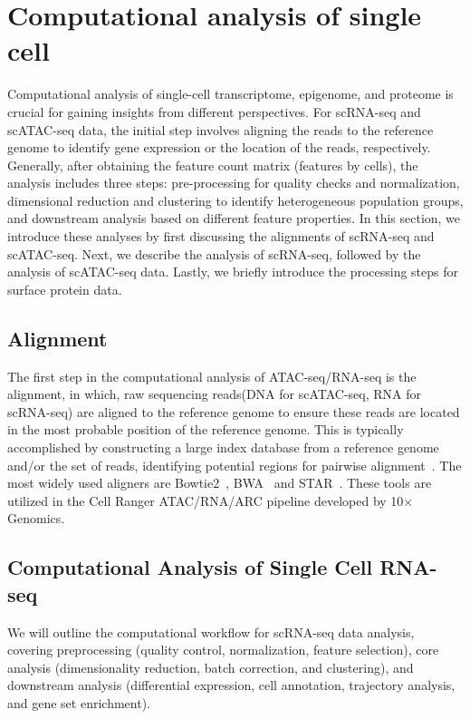 \section{Computational analysis of single cell}
\label{background:computational_singlecell}
Computational analysis of single-cell transcriptome, epigenome, and proteome is crucial for gaining insights from different perspectives. For scRNA-seq and scATAC-seq data, the initial step involves aligning the reads to the reference genome to identify gene expression or the location of the reads, respectively. Generally, after obtaining the feature count matrix (features by cells), the analysis includes three steps: pre-processing for quality checks and normalization, dimensional reduction and clustering to identify heterogeneous population groups, and downstream analysis based on different feature properties. In this section, we introduce these analyses by first discussing the alignments of scRNA-seq and scATAC-seq. Next, we describe the analysis of scRNA-seq, followed by the analysis of scATAC-seq data. Lastly, we briefly introduce the processing steps for surface protein data.

\subsection{Alignment}
\label{background:sec2:alignment}
The first step in the computational analysis of ATAC-seq/RNA-seq is the alignment,  in which, raw sequencing reads(DNA for scATAC-seq, RNA for scRNA-seq) are aligned to the reference genome to ensure these reads are located in the most probable position of the reference genome. This is typically accomplished by constructing a large index database from a reference genome and/or the set of reads, identifying potential regions for pairwise alignment~\citep{alser2021alignment}. The most widely used aligners are Bowtie2~\citep{langmead2012bowtie2}, BWA~\citep{li2009BWA} and STAR~\citep{dobin2013star}.  These tools are utilized in the Cell Ranger ATAC/RNA/ARC pipeline developed by 10$\times$ Genomics.

\subsection{Computational Analysis of Single Cell RNA-seq}
\label{background:sec2:scRNA}
We will outline the computational workflow for scRNA-seq data analysis, covering preprocessing (quality control, normalization, feature selection), core analysis (dimensionality reduction, batch correction, and clustering), and downstream analysis (differential expression, cell annotation, trajectory analysis, and gene set enrichment).

